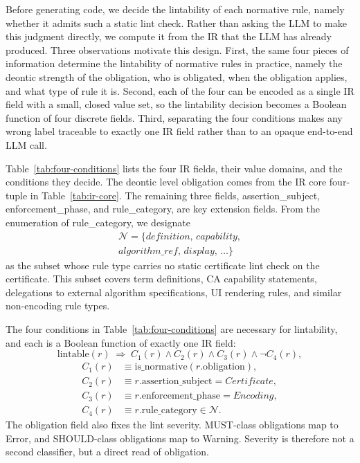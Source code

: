 Before generating code, we decide the lintability of each normative rule, namely whether it admits such a static lint check. Rather than asking the LLM to make this judgment directly, we compute it from the IR that the LLM has already produced. Three observations motivate this design. First, the same four pieces of information determine the lintability of normative rules in practice, namely the deontic strength of the obligation, who is obligated, when the obligation applies, and what type of rule it is. Second, each of the four can be encoded as a single IR field with a small, closed value set, so the lintability decision becomes a Boolean function of four discrete fields. Third, separating the four conditions makes any wrong label traceable to exactly one IR field rather than to an opaque end-to-end LLM call.

Table~\ref{tab:four-conditions} lists the four IR fields, their value domains, and the conditions they decide. The deontic level obligation comes from the IR core four-tuple in Table~\ref{tab:ir-core}. The remaining three fields, assertion\_\allowbreak subject, enforcement\_\allowbreak phase, and rule\_\allowbreak category, are key extension fields. From the enumeration of rule\_\allowbreak category, we designate
\begin{gather*}
\mathcal{N} = \{definition,\,capability,\\
algorithm\_ref,\,display,\,\dots\}
\end{gather*}
as the subset whose rule type carries no static certificate lint check on the certificate. This subset covers term definitions, CA capability statements, delegations to external algorithm specifications, UI rendering rules, and similar non-encoding rule types.

The four conditions in Table~\ref{tab:four-conditions} are necessary for lintability, and each is a Boolean function of exactly one IR field:
\begin{equation}\label{eq:lintable}
\mathrm{lintable}(r) \;\Longrightarrow\; C_1(r)\wedge C_2(r)\wedge C_3(r)\wedge \neg C_4(r),
\end{equation}
\begin{align*}
C_1(r) &\equiv \mathrm{is\_normative}(r.\text{obligation}), \\
C_2(r) &\equiv r.\text{assertion\_subject} = Certificate, \\
C_3(r) &\equiv r.\text{enforcement\_phase} = Encoding, \\
C_4(r) &\equiv r.\text{rule\_category} \in \mathcal{N}.
\end{align*}
The obligation field also fixes the lint severity. MUST-class obligations map to Error, and SHOULD-class obligations map to Warning. Severity is therefore not a second classifier, but a direct read of obligation.


